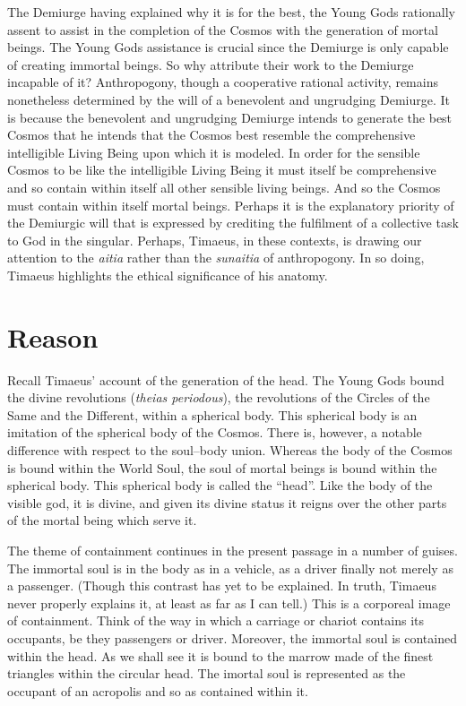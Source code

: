 The Demiurge having explained why it is for the best, the Young Gods rationally assent to assist in the completion of the Cosmos with the generation of mortal beings. The Young Gods assistance is crucial since the Demiurge is only capable of creating immortal beings. So why attribute their work to the Demiurge incapable of it? Anthropogony, though a cooperative rational activity, remains nonetheless determined by the will of a benevolent and ungrudging Demiurge. It is because the benevolent and ungrudging Demiurge intends to generate the best Cosmos that he intends that the Cosmos best resemble the comprehensive intelligible Living Being upon which it is modeled. In order for the sensible Cosmos to be like the intelligible Living Being it must itself be comprehensive and so contain within itself all other sensible living beings. And so the Cosmos must contain within itself mortal beings. Perhaps it is the explanatory priority of the Demiurgic will that is expressed by crediting the fulfilment of a collective task to God in the singular. Perhaps, Timaeus, in these contexts, is drawing our attention to the \emph{aitia} rather than the \emph{sunaitia} of anthropogony. In so doing, Timaeus highlights the ethical significance of his anatomy.



\section{Reason} %
\label{sec:reason}

Recall Timaeus' account of the generation of the head. The Young Gods bound the divine revolutions (\emph{theias periodous}), the revolutions of the Circles of the Same and the Different, within a spherical body. This spherical body is an imitation of the spherical body of the Cosmos. There is, however, a notable difference with respect to the soul–body union. Whereas the body of the Cosmos is bound within the World Soul, the soul of mortal beings is bound within the spherical body. This spherical body is called the “head”. Like the body of the visible god, it is divine, and given its divine status it reigns over the other parts of the mortal being which serve it.

The theme of containment continues in the present passage in a number of guises. The immortal soul is in the body as in a vehicle, as a driver finally not merely as a passenger. (Though this contrast has yet to be explained. In truth, Timaeus never properly explains it, at least as far as I can tell.) This is a corporeal image of containment. Think of the way in which a carriage or chariot contains its occupants, be they passengers or driver. Moreover, the immortal soul is contained within the head. As we shall see it is bound to the marrow made of the finest triangles within the circular head. The imortal soul is represented as the occupant of an acropolis and so as contained within it. 


